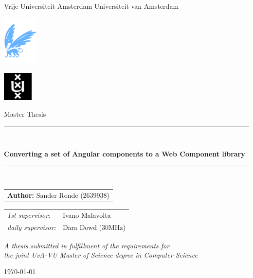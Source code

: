 \documentclass[oneside,11pt]{lib/PhDthesisPSnPDF}
\begin{document}
\thispagestyle{empty}

\begin{center}

	Vrije Universiteit Amsterdam \hspace*{2cm} Universiteit van Amsterdam

	\vspace{1mm}

	\hspace*{-7.5cm}\includegraphics[height=25mm]{figures/front/vu-griffioen.pdf}

	\vspace*{-2cm}\hspace*{7.5cm}\includegraphics[height=15mm]{figures/front/uva_logo.jpg}

	\vspace{2cm}

	{\Large Master Thesis}

	\vspace*{1.5cm}

	\rule{.9\linewidth}{.6pt}\\[0.4cm]
	{\huge \bfseries Converting a set of Angular components to a Web Component library \par}\vspace{0.4cm}
	\rule{.9\linewidth}{.6pt}\\[1.5cm]

	\vspace*{2mm}

	{\Large
		\begin{tabular}{l}
			{\bf Author:} Sander Ronde (2639938)
		\end{tabular}
	}

	\vspace*{2cm}

	\begin{tabular}{ll}
		{\it 1st supervisor:}   & Ivano Malavolta   \\
		{\it daily supervisor:} & Dara Dowd (30MHz) \\
	\end{tabular}

	\vspace*{2.5cm}

	\textit{A thesis submitted in fulfillment of the requirements for\\ the joint UvA-VU Master of Science degree in Computer Science}

	\vspace*{1.8cm}

	\today\\[4cm] %

\end{center}
\end{document}
